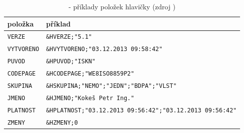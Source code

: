 \begin{table}[H]
    \begin{tabular}{|l|l|}
        \hline
         položka & příklad \\
        \hline
        \hline
         \texttt{VERZE} & \texttt{\&HVERZE;"5.1"} \\ \hline
         \texttt{VYTVORENO} & \texttt{\&HVYTVORENO;"03.12.2013 09:58:42"} \\ \hline
         \texttt{PUVOD} & \texttt{\&HPUVOD;"ISKN"} \\ \hline
         \texttt{CODEPAGE} & \texttt{\&HCODEPAGE;"WE8ISO8859P2"} \\ \hline
         \texttt{SKUPINA} & \texttt{\&HSKUPINA;"NEMO";"JEDN";"BDPA";"VLST"} \\ \hline
         \texttt{JMENO} & \texttt{\&HJMENO;"Kokeš Petr Ing."} \\ \hline
         \texttt{PLATNOST} & \texttt{\&HPLATNOST;"03.12.2013 09:56:42";"03.12.2013 09:56:42"} \\ \hline
         \texttt{ZMENY} & \texttt{\&HZMENY;0} \\
         \hline
    \end{tabular}
    \centering
    \caption[ - příklady položek hlavičky]{ - příklady položek hlavičky (zdroj \citep{struktura_vfk})}
    \label{tab:hlavicka_priklady}
\end{table}

